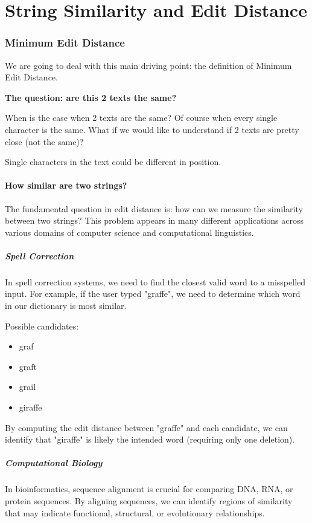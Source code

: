 \documentclass[11pt,a4paper]{article}
\theoremstyle{definition}
\theoremstyle{plain}
\theoremstyle{remark}
\begin{document}
\newpage
\tableofcontents
\newpage

\part{String Similarity and Edit Distance}

\section{Minimum Edit Distance}
We are going to deal with this main driving point: the definition of Minimum Edit Distance.

\textbf{The question: are this 2 texts the same?}

When is the case when 2 texts are the same? Of course when every single character is the same. 
What if we would like to understand if 2 texts are pretty close (not the same)?

Single characters in the text could be different in position.

\subsection{How similar are two strings?}

The fundamental question in edit distance is: how can we measure the similarity between two strings? This problem appears in many different applications across various domains of computer science and computational linguistics.

\subsubsection{Spell Correction}
In spell correction systems, we need to find the closest valid word to a misspelled input. For example, if the user typed "graffe", we need to determine which word in our dictionary is most similar.

Possible candidates:
\begin{itemize}
    \item graf
    \item graft
    \item grail
    \item giraffe
\end{itemize}

By computing the edit distance between "graffe" and each candidate, we can identify that "giraffe" is likely the intended word (requiring only one deletion).

\subsubsection{Computational Biology}
In bioinformatics, sequence alignment is crucial for comparing DNA, RNA, or protein sequences. By aligning sequences, we can identify regions of similarity that may indicate functional, structural, or evolutionary relationships.
\end{document}
